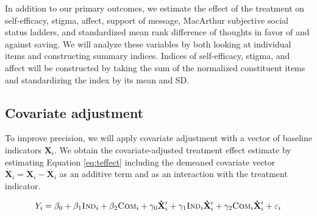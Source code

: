 \documentclass[11pt, a4paper]{article}\usepackage[]{graphicx}\usepackage[]{color}
\begin{document}
        \begin{table}[h]
        \centering
        \caption{Hypothesis tests}
        \label{tab:hypotheses}
        \end{table}

        In addition to our primary outcomes, we estimate the effect of the treatment on self-efficacy, stigma, affect, support of message, MacArthur subjective social status ladders, and standardized mean rank difference of thoughts in favor of and against saving. We will analyze these variables by both looking at individual items and constructing summary indices. Indices of self-efficacy, stigma, and affect will be constructed by taking the sum of the normalized constituent items and standardizing the index by its mean and SD.

    \subsection{Covariate adjustment}

        To improve precision, we will apply covariate adjustment with a vector of baseline indicators $\mathbf{X}_i$. We obtain the covariate-adjusted treatment effect estimate by estimating Equation \ref{eq:teffect} including the demeaned covariate vector $\mathbf{\dot X}_{i} = \mathbf{X}_{i} - \mathbf{\bar X}_{i}$ as an additive term and as an interaction with the treatment indicator.

        \begin{equation} \label{eq:controls}
            Y_{i} = \beta_{0} + \beta_{1}\text{\textsc{Ind}}_{i} + \beta_{2}\text{\textsc{Com}}_{i} + \gamma_{0} \mathbf{\dot X}'_i + \gamma_{1}\text{\textsc{Ind}}_{i} \mathbf{\dot X}'_i + \gamma_{2}\text{\textsc{Com}}_{i} \mathbf{\dot X}'_i + \varepsilon_{i}
        \end{equation}
\end{document}
